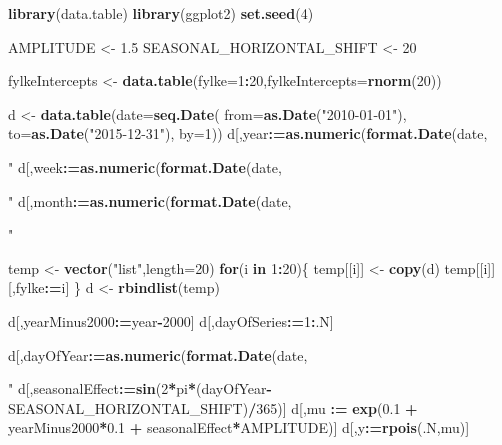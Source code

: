 \documentclass[]{book}
\newenvironment{Shaded}{\begin{snugshade}}{\end{snugshade}}
\newcommand{\KeywordTok}[1]{\textcolor[rgb]{0.13,0.29,0.53}{\textbf{#1}}}
\newcommand{\DataTypeTok}[1]{\textcolor[rgb]{0.13,0.29,0.53}{#1}}
\newcommand{\DecValTok}[1]{\textcolor[rgb]{0.00,0.00,0.81}{#1}}
\newcommand{\FloatTok}[1]{\textcolor[rgb]{0.00,0.00,0.81}{#1}}
\newcommand{\StringTok}[1]{\textcolor[rgb]{0.31,0.60,0.02}{#1}}
\newcommand{\ControlFlowTok}[1]{\textcolor[rgb]{0.13,0.29,0.53}{\textbf{#1}}}
\newcommand{\OperatorTok}[1]{\textcolor[rgb]{0.81,0.36,0.00}{\textbf{#1}}}
\newcommand{\ErrorTok}[1]{\textcolor[rgb]{0.64,0.00,0.00}{\textbf{#1}}}
\newcommand{\NormalTok}[1]{#1}
\begin{document}
\begin{Shaded}
\begin{Highlighting}[]
\KeywordTok{library}\NormalTok{(data.table)}
\KeywordTok{library}\NormalTok{(ggplot2)}
\KeywordTok{set.seed}\NormalTok{(}\DecValTok{4}\NormalTok{)}

\NormalTok{AMPLITUDE <-}\StringTok{ }\FloatTok{1.5}
\NormalTok{SEASONAL_HORIZONTAL_SHIFT <-}\StringTok{ }\DecValTok{20}

\NormalTok{fylkeIntercepts <-}\StringTok{ }\KeywordTok{data.table}\NormalTok{(}\DataTypeTok{fylke=}\DecValTok{1}\OperatorTok{:}\DecValTok{20}\NormalTok{,}\DataTypeTok{fylkeIntercepts=}\KeywordTok{rnorm}\NormalTok{(}\DecValTok{20}\NormalTok{))}

\NormalTok{d <-}\StringTok{ }\KeywordTok{data.table}\NormalTok{(}\DataTypeTok{date=}\KeywordTok{seq.Date}\NormalTok{(}
  \DataTypeTok{from=}\KeywordTok{as.Date}\NormalTok{(}\StringTok{"2010-01-01"}\NormalTok{),}
  \DataTypeTok{to=}\KeywordTok{as.Date}\NormalTok{(}\StringTok{"2015-12-31"}\NormalTok{),}
  \DataTypeTok{by=}\DecValTok{1}\NormalTok{))}
\NormalTok{d[,year}\OperatorTok{:}\ErrorTok{=}\KeywordTok{as.numeric}\NormalTok{(}\KeywordTok{format.Date}\NormalTok{(date,}\StringTok{"%G"}\NormalTok{))]}
\NormalTok{d[,week}\OperatorTok{:}\ErrorTok{=}\KeywordTok{as.numeric}\NormalTok{(}\KeywordTok{format.Date}\NormalTok{(date,}\StringTok{"%V"}\NormalTok{))]}
\NormalTok{d[,month}\OperatorTok{:}\ErrorTok{=}\KeywordTok{as.numeric}\NormalTok{(}\KeywordTok{format.Date}\NormalTok{(date,}\StringTok{"%m"}\NormalTok{))]}

\NormalTok{temp <-}\StringTok{ }\KeywordTok{vector}\NormalTok{(}\StringTok{"list"}\NormalTok{,}\DataTypeTok{length=}\DecValTok{20}\NormalTok{)}
\ControlFlowTok{for}\NormalTok{(i }\ControlFlowTok{in} \DecValTok{1}\OperatorTok{:}\DecValTok{20}\NormalTok{)\{}
\NormalTok{  temp[[i]] <-}\StringTok{ }\KeywordTok{copy}\NormalTok{(d)}
\NormalTok{  temp[[i]][,fylke}\OperatorTok{:}\ErrorTok{=}\NormalTok{i]}
\NormalTok{\}}
\NormalTok{d <-}\StringTok{ }\KeywordTok{rbindlist}\NormalTok{(temp)}

\NormalTok{d[,yearMinus2000}\OperatorTok{:}\ErrorTok{=}\NormalTok{year}\OperatorTok{-}\DecValTok{2000}\NormalTok{]}
\NormalTok{d[,dayOfSeries}\OperatorTok{:}\ErrorTok{=}\DecValTok{1}\OperatorTok{:}\NormalTok{.N]}

\NormalTok{d[,dayOfYear}\OperatorTok{:}\ErrorTok{=}\KeywordTok{as.numeric}\NormalTok{(}\KeywordTok{format.Date}\NormalTok{(date,}\StringTok{"%j"}\NormalTok{))]}
\NormalTok{d[,seasonalEffect}\OperatorTok{:}\ErrorTok{=}\KeywordTok{sin}\NormalTok{(}\DecValTok{2}\OperatorTok{*}\NormalTok{pi}\OperatorTok{*}\NormalTok{(dayOfYear}\OperatorTok{-}\NormalTok{SEASONAL_HORIZONTAL_SHIFT)}\OperatorTok{/}\DecValTok{365}\NormalTok{)]}
\NormalTok{d[,mu }\OperatorTok{:}\ErrorTok{=}\StringTok{ }\KeywordTok{exp}\NormalTok{(}\FloatTok{0.1} \OperatorTok{+}\StringTok{ }\NormalTok{yearMinus2000}\OperatorTok{*}\FloatTok{0.1} \OperatorTok{+}\StringTok{ }\NormalTok{seasonalEffect}\OperatorTok{*}\NormalTok{AMPLITUDE)]}
\NormalTok{d[,y}\OperatorTok{:}\ErrorTok{=}\KeywordTok{rpois}\NormalTok{(.N,mu)]}

}}}}
\end{Highlighting}
\end{Shaded}
\end{document}

